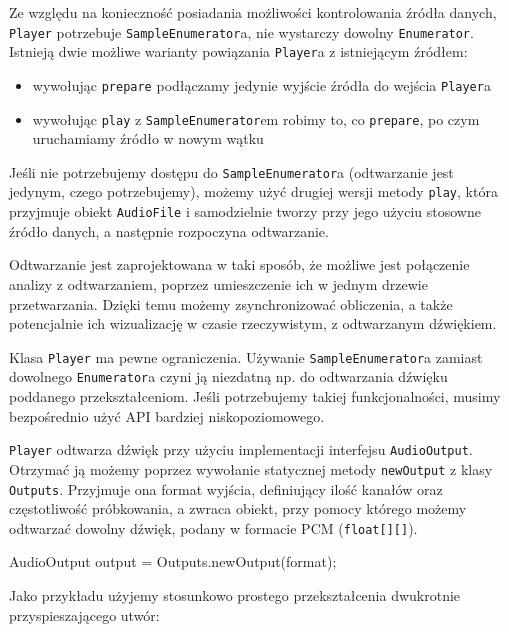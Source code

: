 Ze względu na konieczność posiadania możliwości kontrolowania źródła danych, \texttt{Player}
potrzebuje \texttt{SampleEnumerator}a, nie wystarczy dowolny \texttt{Enumerator}. Istnieją dwie
możliwe warianty powiązania \texttt{Player}a z istniejącym źródłem:

\begin{itemize}
  \item wywołując \texttt{prepare} podłączamy jedynie wyjście źródła do wejścia \texttt{Player}a

  \item wywołując \texttt{play} z \texttt{SampleEnumerator}em robimy to, co \texttt{prepare}, po
    czym uruchamiamy źródło w nowym wątku

\end{itemize}

Jeśli nie potrzebujemy dostępu do \texttt{SampleEnumerator}a (odtwarzanie jest jedynym, czego
potrzebujemy), możemy użyć drugiej wersji metody \texttt{play}, która przyjmuje obiekt
\texttt{AudioFile} i samodzielnie tworzy przy jego użyciu stosowne źródło danych, a następnie
rozpoczyna odtwarzanie.

\begin{Tip}
Odtwarzanie jest zaprojektowana w taki sposób, że możliwe jest połączenie analizy z odtwarzaniem,
poprzez umieszczenie ich w jednym drzewie przetwarzania. Dzięki temu możemy zsynchronizować
obliczenia, a także potencjalnie ich wizualizację w czasie rzeczywistym, z odtwarzanym dźwiękiem.
\end{Tip}

Klasa \texttt{Player} ma pewne ograniczenia. Używanie \texttt{SampleEnumerator}a zamiast dowolnego
\texttt{Enumerator}a czyni ją niezdatną np. do odtwarzania dźwięku poddanego przekształceniom. Jeśli
potrzebujemy takiej funkcjonalności, musimy bezpośrednio użyć API bardziej niskopoziomowego.

\texttt{Player} odtwarza dźwięk przy użyciu implementacji interfejsu \texttt{AudioOutput}. Otrzymać
ją możemy poprzez wywołanie statycznej metody \texttt{newOutput} z klasy \texttt{Outputs}. Przyjmuje
ona format wyjścia, definiujący ilość kanałów oraz częstotliwość próbkowania, a zwraca obiekt, przy
pomocy którego możemy odtwarzać dowolny dźwięk, podany w formacie PCM (\texttt{float[][]}).

\begin{java}
AudioOutput output = Outputs.newOutput(format);
\end{java}

Jako przykładu użyjemy stosunkowo prostego przekształcenia dwukrotnie przyspieszającego utwór:

